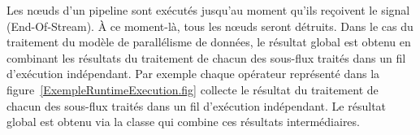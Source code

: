 Les nœuds d'un pipeline sont ex\'ecut\'es jusqu'au moment qu'ils re\c coivent le signal  (End-Of-Stream). \`A ce moment-l\`a, tous les nœuds seront d\'etruits. Dans le cas du traitement du mod\`ele de parall\'elisme de donn\'ees, le r\'esultat global est obtenu en combinant les r\'esultats du traitement de chacun des sous-flux trait\'es dans un fil d'ex\'ecution ind\'ependant. Par exemple chaque op\'erateur  repr\'esent\'e dans la figure~\ref{ExempleRuntimeExecution.fig} collecte le r\'esultat du traitement de chacun des sous-flux trait\'es dans un fil d'ex\'ecution ind\'ependant. Le r\'esultat global est obtenu via la classe  qui combine ces r\'esultats interm\'ediaires.